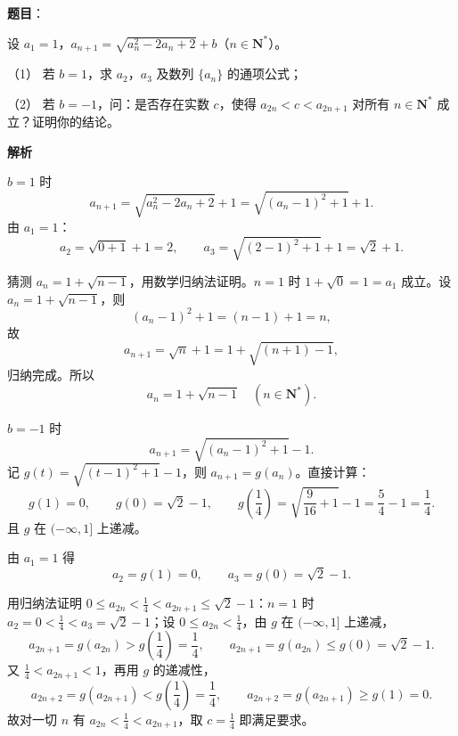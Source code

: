 \begin{answer}

\textbf{题目}：

设 $a_1=1$，$a_{n+1}=\sqrt{a_n^2-2a_n+2}+b$（$n\in\mathbf N^*$）。

（1） 若 $b=1$，求 $a_2$，$a_3$ 及数列 $\{a_n\}$ 的通项公式；

（2） 若 $b=-1$，问：是否存在实数 $c$，使得 $a_{2n}<c<a_{2n+1}$ 对所有 $n\in\mathbf N^*$ 成立？证明你的结论。

\textbf{解析}


$b=1$ 时
\nopagebreak[4]
\[a_{n+1}=\sqrt{a_n^2-2a_n+2}+1=\sqrt{(a_n-1)^2+1}+1 .\]
由 $a_1=1$：
\nopagebreak[4]
\[a_2=\sqrt{0+1}+1=2,\qquad a_3=\sqrt{(2-1)^2+1}+1=\sqrt2+1 .\]

猜测 $a_n=1+\sqrt{n-1}$，用数学归纳法证明。$n=1$ 时 $1+\sqrt0=1=a_1$ 成立。设 $a_n=1+\sqrt{n-1}$，则
\nopagebreak[4]
\[(a_n-1)^2+1=(n-1)+1=n,\]
故
\nopagebreak[4]
\[a_{n+1}=\sqrt n+1=1+\sqrt{(n+1)-1},\]
归纳完成。所以
\nopagebreak[4]
\[a_n=1+\sqrt{n-1}\quad(n\in\mathbf N^*).\]


$b=-1$ 时
\nopagebreak[4]
\[a_{n+1}=\sqrt{(a_n-1)^2+1}-1 .\]
记 $g(t)=\sqrt{(t-1)^2+1}-1$，则 $a_{n+1}=g(a_n)$。直接计算：
\nopagebreak[4]
\[g(1)=0,\qquad g(0)=\sqrt2-1,\qquad g\left(\frac14\right)=\sqrt{\frac9{16}+1}-1=\frac54-1=\frac14 .\]
且 $g$ 在 $(-\infty,1]$ 上递减。

由 $a_1=1$ 得
\nopagebreak[4]
\[a_2=g(1)=0,\qquad a_3=g(0)=\sqrt2-1 .\]

用归纳法证明 $0\leqslant a_{2n}<\frac14<a_{2n+1}\leqslant\sqrt2-1$：$n=1$ 时 $a_2=0<\frac14<a_3=\sqrt2-1$；设 $0\leqslant a_{2n}<\frac14$，由 $g$ 在 $(-\infty,1]$ 上递减，
\nopagebreak[4]
\[a_{2n+1}=g(a_{2n})>g\left(\frac14\right)=\frac14,\qquad
a_{2n+1}=g(a_{2n})\leqslant g(0)=\sqrt2-1 .\]
又 $\frac14<a_{2n+1}<1$，再用 $g$ 的递减性，
\nopagebreak[4]
\[a_{2n+2}=g(a_{2n+1})<g\left(\frac14\right)=\frac14,\qquad
a_{2n+2}=g(a_{2n+1})\geqslant g(1)=0 .\]
故对一切 $n$ 有 $a_{2n}<\frac14<a_{2n+1}$，取 $c=\frac14$ 即满足要求。


\gkanswer{答案（2）：存在，$c=\dfrac14$。令 $g(t)=\sqrt{(t-1)^2+1}-1$，由 $g$ 在 $(-\infty,1]$ 上递减、$g\left(\dfrac14\right)=\dfrac14$，归纳得 $0\leqslant a_{2n}<\dfrac14<a_{2n+1}$。}

\end{answer}